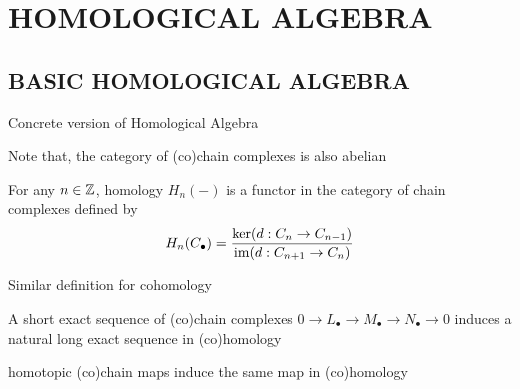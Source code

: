 \chapter{HOMOLOGICAL ALGEBRA}

\section{BASIC HOMOLOGICAL ALGEBRA}
Concrete version of Homological Algebra

\begin{definition}
	
	Note that, the category of (co)chain complexes is also abelian
\end{definition}

\begin{definition}[(co)homology]
	For any $n \in \mathbb{Z}$, homology $H_n(-)$ is a functor in the category of chain complexes defined by
	$$
		H_n(C_\bullet) = \frac{\ker (d: C_n \to C_{n-1})}{\operatorname{im} (d: C_{n+1} \to C_n)}
	$$
	
	Similar definition for cohomology
\end{definition}

\begin{definition}
\end{definition}

\begin{lemma}
	A short exact sequence of (co)chain complexes $0 \to L_\bullet \to M_\bullet \to N_\bullet \to 0$ induces a natural long exact sequence in (co)homology
	\begin{center}
	\end{center}
\end{lemma}

\begin{definition}
\end{definition}

\begin{proposition}
	homotopic (co)chain maps induce the same map in (co)homology
\end{proposition}

